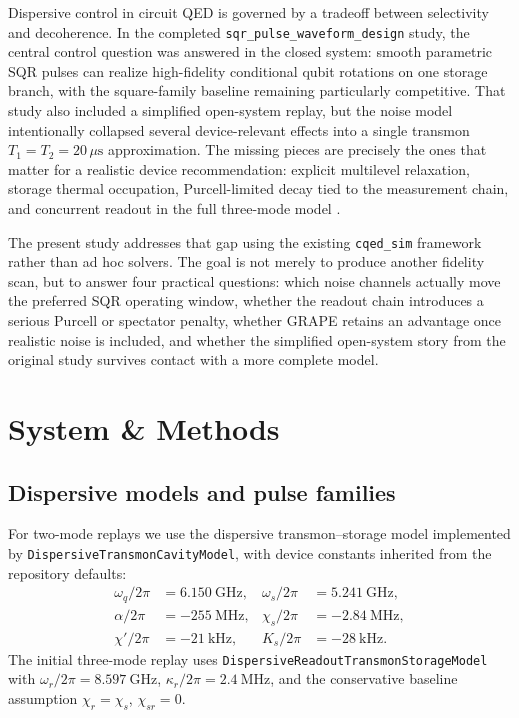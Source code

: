 \documentclass[twocolumn,prl,aps,floatfix]{revtex4-2}
\begin{document}
Dispersive control in circuit QED is governed by a tradeoff between selectivity and decoherence.
In the completed \texttt{sqr\_pulse\_waveform\_design} study, the central control question was answered in the
closed system: smooth parametric SQR pulses can realize high-fidelity conditional qubit rotations on one storage
branch, with the square-family baseline remaining particularly competitive. That study also included a simplified
open-system replay, but the noise model intentionally collapsed several device-relevant effects into a single
transmon $T_1=T_2=20\,\mu\mathrm{s}$ approximation. The missing pieces are precisely the ones that matter for a realistic
device recommendation: explicit multilevel relaxation, storage thermal occupation, Purcell-limited decay tied to the
measurement chain, and concurrent readout in the full three-mode model \cite{Blais2021,Krantz2019,Boissonneault2009}.

The present study addresses that gap using the existing \texttt{cqed\_sim} framework rather than ad hoc solvers.
The goal is not merely to produce another fidelity scan, but to answer four practical questions: which noise channels
actually move the preferred SQR operating window, whether the readout chain introduces a serious Purcell or spectator
penalty, whether GRAPE retains an advantage once realistic noise is included, and whether the simplified open-system
story from the original study survives contact with a more complete model.

\section{System \& Methods}

\subsection{Dispersive models and pulse families}

For two-mode replays we use the dispersive transmon--storage model implemented by
\texttt{DispersiveTransmonCavityModel}, with device constants inherited from the repository defaults:
\begin{align}
    \omega_q / 2\pi &= 6.150~\mathrm{GHz}, & \omega_s / 2\pi &= 5.241~\mathrm{GHz}, \\
    \alpha / 2\pi &= -255~\mathrm{MHz}, & \chi_s / 2\pi &= -2.84~\mathrm{MHz}, \\
    \chi' / 2\pi &= -21~\mathrm{kHz}, & K_s / 2\pi &= -28~\mathrm{kHz}.
\end{align}
The initial three-mode replay uses \texttt{DispersiveReadoutTransmonStorageModel} with
\(\omega_r / 2\pi = 8.597~\mathrm{GHz}\), \(\kappa_r / 2\pi = 2.4~\mathrm{MHz}\), and the conservative baseline
assumption \(\chi_r = \chi_s\), \(\chi_{sr}=0\).
\end{document}
